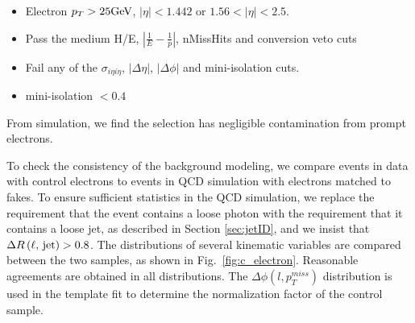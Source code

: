 \documentclass[thesis.tex]{subfiles}
\renewcommand\_{\textunderscore\allowbreak}
\begin{document}
\begin{itemize}
    \item Electron $p_T > 25\text{GeV}$, $|\eta| < 1.442$ or $1.56 < |\eta| < 2.5$.
    \item Pass the medium H/E, $|\frac{1}{E}-\frac{1}{p}|$, nMissHits and conversion veto cuts
    \item Fail any of the $\sigma_{i\eta i\eta}$, $|\Delta\eta|$, $|\Delta\phi|$ and mini-isolation cuts. 
		\item mini-isolation $< 0.4$
\end{itemize}
From simulation, we find the selection has negligible contamination from prompt
electrons.

To check the consistency of the background modeling, we compare events in data
with control electrons to events in QCD simulation with electrons matched to
fakes. To ensure sufficient statistics in the QCD simulation, we replace the
requirement that the event contains a loose photon with the requirement that it
contains a loose jet, as described in Section \ref{sec:jetID}, and we insist that
$\Delta R\left(\textrm{\ensuremath{\ell}, jet}\right) > 0.8$. The distributions of several
kinematic variables are compared between the two samples, as shown in
Fig.~\ref{fig:c_electron}. Reasonable agreements are obtained in all distributions.
The $\Delta\phi\left(l, p_{T}^{miss}\right)$ distribution
is used in the template fit to determine the normalization factor of the control
sample.
\end{document}
